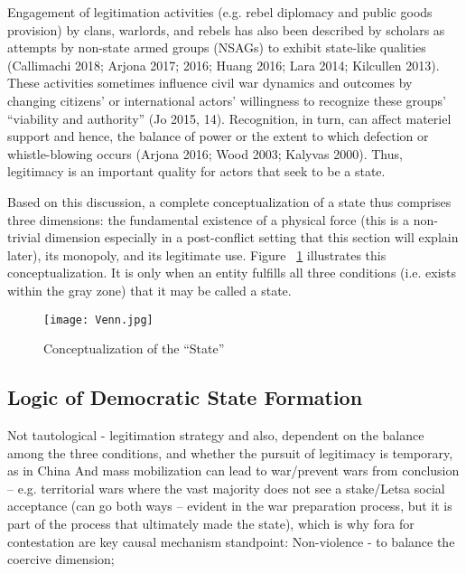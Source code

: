 \documentclass [11pt]{article}
\begin{document}
Engagement of legitimation activities (e.g. rebel diplomacy and public goods provision) by clans, warlords, and rebels has also been described by scholars as attempts by non-state armed groups (NSAGs) to exhibit state-like qualities (Callimachi 2018; Arjona 2017; 2016; Huang 2016; Lara 2014; Kilcullen 2013). These activities sometimes influence civil war dynamics and outcomes by changing citizens' or international actors' willingness to recognize these groups' ``viability and authority'' (Jo 2015, 14). Recognition, in turn, can affect materiel support and hence, the balance of power or the extent to which defection or whistle-blowing occurs (Arjona 2016; Wood 2003; Kalyvas 2000). Thus, legitimacy is an important quality for actors that seek to be a state.

Based on this discussion, a complete conceptualization of a state thus comprises three dimensions: the fundamental existence of a physical force (this is a non-trivial dimension especially in a post-conflict setting that this section will explain later), its monopoly, and its legitimate use. Figure ~\ref{fig1} illustrates this conceptualization. It is only when an entity fulfills all three conditions (i.e. exists within the gray zone) that it may be called a state.

\begin{figure} [h!]

\caption{Conceptualization of the ``State''}
\label{fig1}%
\begin{center} 
\small
\texttt{[image: Venn.jpg]}
 
\end{center}
\end{figure}

\subsection*{Logic of Democratic State Formation} %






Not tautological - legitimation strategy and also, dependent on the balance among the three conditions, and whether the pursuit of legitimacy is temporary, as in China
And mass mobilization can lead to war/prevent wars from conclusion -- e.g. territorial wars where the vast majority does not see a stake/Letsa
social acceptance (can go both ways -- evident in the war preparation process, but it is part of the process that ultimately made the state), which is why fora for contestation are key
causal mechanism standpoint: Non-violence - to balance the coercive dimension; 
\end{document}
